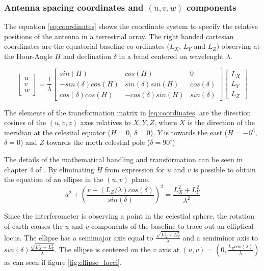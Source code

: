 \documentclass[11pt]{article}
\begin{document}
\subsubsection{Antenna spacing coordinates and $(u,v,w)$ components}
\label{sec:uvcover}
The equation \ref{eq:coordinates} shows the coordinate system to specify the relative positions of the antenna in a terrestrial array. The right handed cartesian coordinates are the equatorial baseline co-ordinates ($L_X$, $L_Y$ and $L_Z$) observing at the Hour-Angle $H$ and declination $\delta$ in a band centered on wavelenght $\lambda$. 

\begin{equation}\label{eq:coordinates}
\begin{bmatrix}
u\\
v\\
w
\end{bmatrix}
=\frac{1}{\lambda}
\begin{bmatrix}
sin(H) & cos(H) & 0\\
-sin(\delta)cos(H) & sin(\delta)sin(H) & cos(\delta)\\
cos(\delta)cos(H) & -cos(\delta)sin(H) & sin(\delta)
\end{bmatrix}
\begin{bmatrix}
L_{X}\\
L_{Y}\\
L_{Z}
\end{bmatrix}
\end{equation}

The elements of the transformation matrix in \ref{eq:coordinates} are the direction cosines of the $(u,v,z)$ axes relatives to $X, Y, Z$, where $X$ is the direction of the meridian at the celestial equator ($H=0$, $\delta=0$), $Y$ is towards the east ($H=-6^h$, $\delta=0$) and $Z$ towards the north celestial pole ($\delta=90^{\circ}$)

The details of the mathematical handling and transformation can be seen in chapter 4 of \cite{thompson01}. By eliminating $H$ from expression for $u$ and $v$ is possible to obtain the equation of an ellipse in the $(u,v)$ plane.
\begin{equation}
u^2 + \left(
\frac{v-(L_Z/\lambda)cos(\delta)}{sin(\delta)}\right)^2
=
\frac{L_X^2 + L_Y^2}{\lambda^2}
\end{equation}

Since the interferometer is observing a point in the celestial sphere, the rotation of earth causes the $u$ and $v$ components of the baseline to trace out an elliptical locus. The ellipse has a semimajor axis equal to $\frac{\sqrt{L_X^2+L_Y^2}}{\lambda}$ and a semiminor axis to $sin(\delta)\frac{\sqrt{L_X^2+L_Y^2}}{\lambda}$. The ellipse is centered on the $v$ axis at $(u,v) = (0, \frac{L_Zcos(\lambda)}{\lambda})$ as can seen if figure \ref{fig:ellipse_locci}. 
\end{document}
